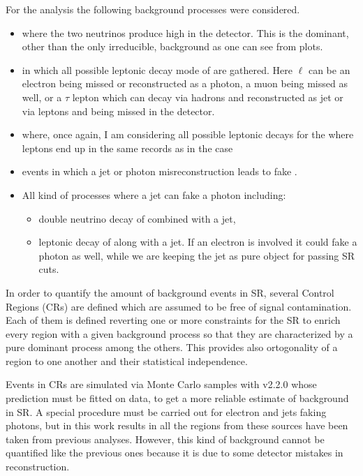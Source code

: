 For the \mph analysis the following background processes were considered.
\begin{itemize}
\item \znng where the two neutrinos produce high \met in the detector. This is the dominant, other than the only irreducible, background as one can see from plots.
\item \wg in which all possible leptonic decay mode of \Wboson are gathered. Here $\ell$ can be an electron being missed or reconstructed as a photon, a muon being missed as well, or a $\tau$ lepton which can decay via hadrons and reconstructed as jet or via leptons and being missed in the detector.
\item \zg where, once again, I am considering all possible leptonic decays for the \Zboson where leptons end up in the same records as in the \Wboson case
\item \gj events in which a jet or photon misreconstruction leads to fake \met.
\item All kind of processes where a jet can fake a photon including:
  \begin{itemize}
  \item double neutrino decay of \Zboson combined with a jet,
  \item leptonic decay of \Wboson along with a jet. If an electron is involved it could fake a photon as well, while we are keeping the jet as pure object for passing SR cuts.
  \end{itemize}
\end{itemize}

In order to quantify the amount of background events in SR, several Control Regions (CRs) are defined which are assumed to be free of signal contamination. Each of them is defined reverting one or more constraints for the SR to enrich every region with a given background process so that they are characterized by a pure dominant process among the others. This provides also ortogonality of a region to one another and their statistical independence.

Events in CRs are simulated via Monte Carlo samples with \SHERPA v2.2.0 whose prediction must be fitted on data, to get a more reliable estimate of background in SR. A special procedure must be carried out for electron and jets faking photons, but in this work results in all the regions from these sources have been taken from previous analyses. However, this kind of background cannot be quantified like the previous ones because it is due to some detector mistakes in reconstruction.


